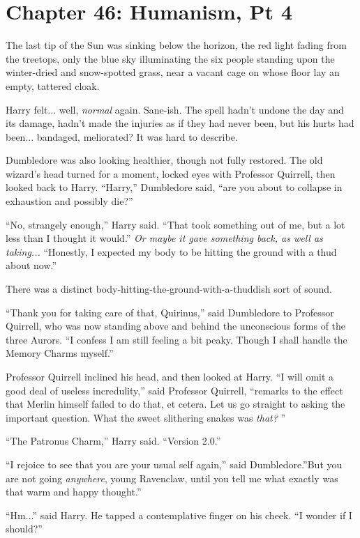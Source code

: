 \chapter{Chapter 46: Humanism, Pt 4}
The last tip of the Sun was sinking below the horizon, the red light
fading from the treetops, only the blue sky illuminating the six people
standing upon the winter-dried and snow-spotted grass, near a vacant
cage on whose floor lay an empty, tattered cloak.

Harry felt... well, \emph{normal} again. Sane-ish. The spell hadn't
undone the day and its damage, hadn't made the injuries as if they had
never been, but his hurts had been... bandaged, meliorated? It was
hard to describe.

Dumbledore was also looking healthier, though not fully restored. The
old wizard's head turned for a moment, locked eyes with Professor
Quirrell, then looked back to Harry. ``Harry,'' Dumbledore said, ``are
you about to collapse in exhaustion and possibly die?''

``No, strangely enough,'' Harry said. ``That took something out of me,
but a lot less than I thought it would.'' \emph{Or maybe it gave
something back, as well as taking...} ``Honestly, I expected my
body to be hitting the ground with a thud about now.''

There was a distinct body-hitting-the-ground-with-a-thuddish sort of
sound.

``Thank you for taking care of that, Quirinus,'' said Dumbledore to
Professor Quirrell, who was now standing above and behind the
unconscious forms of the three Aurors. ``I confess I am still feeling a
bit peaky. Though I shall handle the Memory Charms myself.''

Professor Quirrell inclined his head, and then looked at Harry. ``I will
omit a good deal of useless incredulity,'' said Professor Quirrell,
``remarks to the effect that Merlin himself failed to do that, et cetera.
Let us go straight to asking the important question. What the sweet
slithering snakes was \emph{that?} ''

``The Patronus Charm,'' Harry said. ``Version 2.0.''

``I rejoice to see that you are your usual self again,'' said
Dumbledore.''But you are not going \emph{anywhere}, young Ravenclaw,
until you tell me what exactly was that warm and happy thought.''

``Hm...'' said Harry. He tapped a contemplative finger on his
cheek. ``I wonder if I should?''

